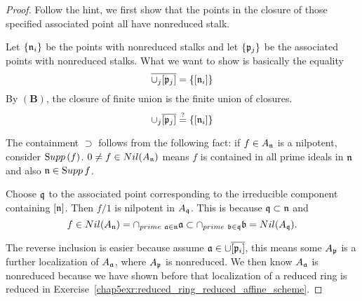 \begin{proof}
Follow the hint, we first show that the points in the closure of those specified associated point all have nonreduced stalk.

Let $\{{\mathfrak n}_i\}$ be the points with nonreduced stalks and let $\{{\mathfrak p}_j\}$ be the associated points with nonreduced stalks. What we want to show is basically the equality
$$
\overline{\cup_j [{\mathfrak p}_j]}=\{[{\mathfrak n}_i]\}
$$
By $\mathbf{(B)}$, the closure of finite union is the finite union of closures.
$$
\cup_j \overline{[{\mathfrak p}_j]}\overset{?}{=}\{[{\mathfrak n}_i]\}
$$

The containment $\supset$ follows from the following fact: if $f\in A_{\mathfrak n}$ is a nilpotent, consider ${\text Supp\thinspace}(f)$.
$0\neq f\in Nil(A_{\mathfrak n})$ means $f$ is contained in all prime ideals in ${\mathfrak n}$ and also ${\mathfrak n}\in {\text Supp\thinspace} f$.

Choose $\mathfrak q$ to the associated point corresponding to the irreducible component containing $[{\mathfrak n}]$. Then $f/1$ is nilpotent in $A_\mathfrak q$. This is because $\mathfrak q\subset {\mathfrak n}$ and $$f\in Nil(A_{\mathfrak n})=\cap_{prime\ {\mathfrak a}\in {\mathfrak n}}{\mathfrak a}\subset \cap_{prime\ {\mathfrak b}\in \mathfrak q}{\mathfrak b}=Nil(A_\mathfrak q).$$

The reverse inclusion is easier because assume
${\mathfrak a}\in \cup\overline{[{\mathfrak p}_i]}$, this means some $A_{\mathfrak p}$ is a further localization of $A_{\mathfrak a}$, where $A_{\mathfrak p}$ is nonreduced. We then know $A_{\mathfrak a}$ is nonreduced because we have shown before that localization of a reduced ring is reduced in Exercise~\ref{chap5exr:reduced_ring_reduced_affine_scheme}.
\end{proof}
